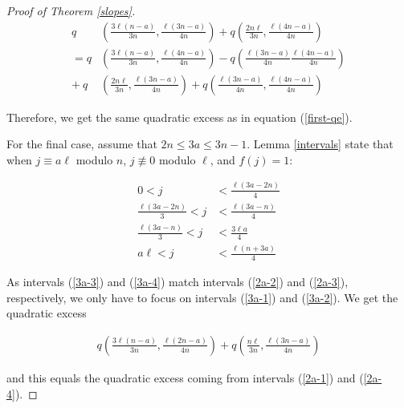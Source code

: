 \documentclass[10pt,a4paper]{amsart}
\begin{document}
\begin{proof}[Proof of Theorem \ref{slopes}]
\begin{align*}
   q&\left(\frac{3\ell(n-a)}{3n}, \frac{\ell(3n-a)}{4n}\right) + q\left(\frac{2n\ell}{3n}, \frac{\ell(4n-a)}{4n}\right)  \\ =  q&\left(\frac{3\ell(n-a)}{3n}, \frac{\ell(4n-a)}{4n} \right) - q\left(\frac{\ell(3n-a)}{4n} \frac{\ell(4n-a)}{4n} \right) \\ + \ q&\left(\frac{2n\ell}{3n}, \frac{\ell(3n-a)}{4n} \right) + q\left(\frac{\ell(3n-a)}{4n},\frac{\ell(4n-a)}{4n} \right)
\end{align*}

Therefore, we get the same quadratic excess as in equation (\ref{first-qe}).

For the final case, assume that $2n \leq 3a \leq 3n-1$. Lemma \ref{intervals} state that when $j \equiv a\ell$ modulo $n$, $j \not \equiv 0$ modulo $\ell$, and $f(j) = 1$:

\begin{align}
    0 < j& < \frac{\ell(3a-2n)}{4} \label{3a-1} \\
    \frac{\ell(3a-2n)}{3} < j& < \frac{\ell(3a-n)}{4} \label{3a-2} \\
    \frac{\ell(3a-n)}{3} < j & < \frac{3\ell a}{4} \label{3a-3} \\
    a\ell < j& < \frac{\ell(n+3a)}{4} \label{3a-4}
\end{align}

As intervals (\ref{3a-3}) and (\ref{3a-4}) match intervals (\ref{2a-2}) and (\ref{2a-3}), respectively, we only have to focus on intervals (\ref{3a-1}) and (\ref{3a-2}). We get the quadratic excess

\begin{align*}
    q\left(\frac{3\ell(n-a)}{3n}, \frac{\ell(2n-a)}{4n} \right) + q\left(\frac{n\ell}{3n}, \frac{\ell(3n-a)}{4n} \right)
\end{align*}

and this equals the quadratic excess coming from intervals (\ref{2a-1}) and (\ref{2a-4}).
\end{proof}
\end{document}
